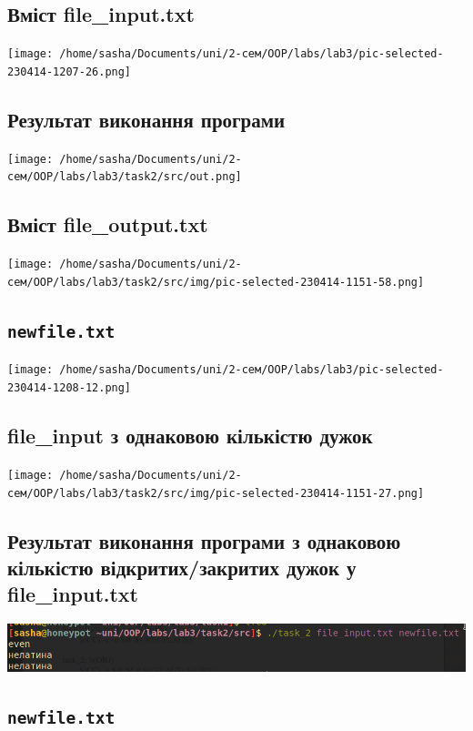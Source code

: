 \documentclass[a4paper, 12pt, oneside]{extarticle}
\begin{document}
\subsection*{Вміст file_input.txt}

\texttt{[image: /home/sasha/Documents/uni/2-сем/OOP/labs/lab3/pic-selected-230414-1207-26.png]}

\subsection*{Результат виконання програми}

\texttt{[image: /home/sasha/Documents/uni/2-сем/OOP/labs/lab3/task2/src/out.png]}

\subsection*{Вміст file_output.txt}
\texttt{[image: /home/sasha/Documents/uni/2-сем/OOP/labs/lab3/task2/src/img/pic-selected-230414-1151-58.png]}

\subsection*{\texttt{newfile.txt}}

\texttt{[image: /home/sasha/Documents/uni/2-сем/OOP/labs/lab3/pic-selected-230414-1208-12.png]}

\subsection{file_input з однаковою кількістю дужок}

\texttt{[image: /home/sasha/Documents/uni/2-сем/OOP/labs/lab3/task2/src/img/pic-selected-230414-1151-27.png]}

\subsection*{Результат виконання програми з однаковою кількістю відкритих/закритих дужок у file_input.txt}

\includegraphics[width=.9\textwidth]{un.png}

\subsection*{\texttt{newfile.txt}}
\end{document}
